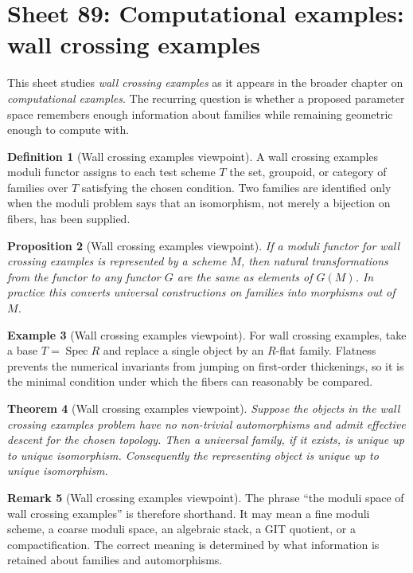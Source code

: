 \documentclass[11pt]{amsart}
\newtheorem{theorem}{Theorem}[section]
\newtheorem{proposition}[theorem]{Proposition}
\theoremstyle{definition}
\newtheorem{definition}[theorem]{Definition}
\newtheorem{example}[theorem]{Example}
\newtheorem{remark}[theorem]{Remark}
\newcommand{\Spec}{\operatorname{Spec}}
\begin{document}
\section{Sheet 89: Computational examples: wall crossing examples}
This sheet studies \emph{wall crossing examples} as it appears in the broader chapter on \emph{computational examples}.  The recurring question is whether a proposed parameter space remembers enough information about families while remaining geometric enough to compute with.
\begin{definition}[Wall crossing examples viewpoint]
A wall crossing examples moduli functor assigns to each test scheme $T$ the set, groupoid, or category of families over $T$ satisfying the chosen condition.  Two families are identified only when the moduli problem says that an isomorphism, not merely a bijection on fibers, has been supplied.
\end{definition}
\begin{proposition}[Wall crossing examples viewpoint]
If a moduli functor for wall crossing examples is represented by a scheme $M$, then natural transformations from the functor to any functor $G$ are the same as elements of $G(M)$.  In practice this converts universal constructions on families into morphisms out of $M$.
\end{proposition}
\begin{example}[Wall crossing examples viewpoint]
For wall crossing examples, take a base $T=\Spec R$ and replace a single object by an $R$-flat family.  Flatness prevents the numerical invariants from jumping on first-order thickenings, so it is the minimal condition under which the fibers can reasonably be compared.
\end{example}
\begin{theorem}[Wall crossing examples viewpoint]
Suppose the objects in the wall crossing examples problem have no non-trivial automorphisms and admit effective descent for the chosen topology.  Then a universal family, if it exists, is unique up to unique isomorphism.  Consequently the representing object is unique up to unique isomorphism.
\end{theorem}
\begin{remark}[Wall crossing examples viewpoint]
The phrase ``the moduli space of wall crossing examples'' is therefore shorthand.  It may mean a fine moduli scheme, a coarse moduli space, an algebraic stack, a GIT quotient, or a compactification.  The correct meaning is determined by what information is retained about families and automorphisms.
\end{remark}
\end{document}
